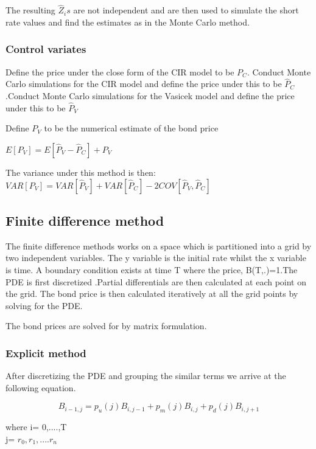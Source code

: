\documentclass[12pt,a4paper]{article}
\begin{document}
The resulting $\hat{Z}_{i}s$ are not independent and are then used to simulate the short rate values and find the estimates as in the Monte Carlo method.   

 
\subsubsection{Control variates}

Define the price under the close form of the CIR model to be $P_{C}$. Conduct Monte Carlo simulations for the CIR model and define the price under this to be $\hat{P}_{C}$.Conduct Monte Carlo simulations for the Vasicek model and define the price under this to be $\hat{P}_{V}$

Define $P_{V}$ to be the numerical estimate of the bond price

$E[P_{V}]=E[\hat{P}_{V}-\hat{P}_{C}]+P_{V} $

The variance under this method is then:  
\\$VAR[P_{V}]=VAR[\hat{P}_{V}]+VAR[\hat{P}_{C}]-2COV[\hat{P}_{V},\hat{P}_{C}]$ 


    
\subsection{Finite difference method}

The finite difference methods works on a space which is partitioned into a grid by two independent variables. The y variable is the initial rate whilst the x variable is time. A boundary condition exists at time T where the price, B(T,.)=1.The PDE is first discretized .Partial differentials are then calculated at each point on the grid. The bond price is then calculated iteratively at all the grid points by solving for the PDE.

The bond prices are solved for by matrix formulation.    


\subsubsection{Explicit method}

After discretizing the PDE and grouping the similar terms we arrive at the following equation.  

$$B_{i-1,j}=p_u(j)B_{i,j-1}+p_m(j)B_{i,j}+p_d(j)B_{i,j+1}$$ 

where i= 0,....,T \\
      j= $r_0,r_1,....r_n$
      
\end{document}
